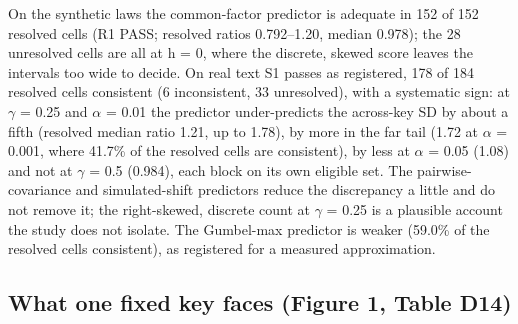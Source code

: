 \documentclass[11pt,letterpaper]{article}
\begin{document}
On the synthetic laws the common-factor predictor is adequate in 152 of 152 resolved cells (R1 PASS; resolved ratios 0.792--1.20, median 0.978); the 28 unresolved cells are all at h = 0, where the discrete, skewed score leaves the intervals too wide to decide. On real text S1 passes as registered, 178 of 184 resolved cells consistent (6 inconsistent, 33 unresolved), with a systematic sign: at \ensuremath{\gamma} = 0.25 and \ensuremath{\alpha} = 0.01 the predictor under-predicts the across-key SD by about a fifth (resolved median ratio 1.21, up to 1.78), by more in the far tail (1.72 at \ensuremath{\alpha} = 0.001, where 41.7\% of the resolved cells are consistent), by less at \ensuremath{\alpha} = 0.05 (1.08) and not at \ensuremath{\gamma} = 0.5 (0.984), each block on its own eligible set. The pairwise-covariance and simulated-shift predictors reduce the discrepancy a little and do not remove it; the right-skewed, discrete count at \ensuremath{\gamma} = 0.25 is a plausible account the study does not isolate. The Gumbel-max predictor is weaker (59.0\% of the resolved cells consistent), as registered for a measured approximation.

\hypertarget{what-one-fixed-key-faces-figure-1-table-d14}{%
\subsection{What one fixed key faces (Figure 1, Table D14)}\label{what-one-fixed-key-faces-figure-1-table-d14}}
\end{document}
